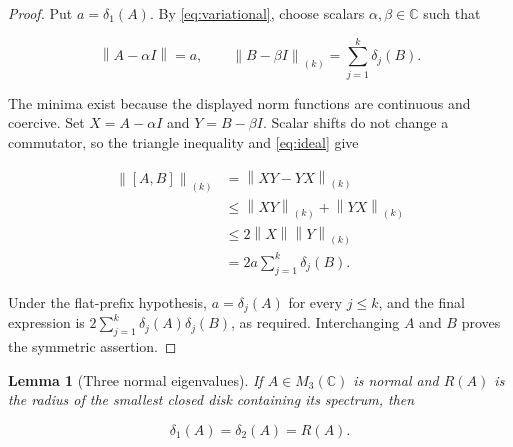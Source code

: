 \documentclass[11pt]{article}
\newtheorem{lemma}{Lemma}
\newcommand{\C}{\mathbb C}
\newcommand{\M}{M}
\newcommand{\norm}[1]{\left\lVert #1\right\rVert}
\begin{document}
\begin{proof}
Put \(a=\delta_1(A)\).  By \eqref{eq:variational}, choose scalars
\(\alpha,\beta\in\C\) such that

\[
 \norm{A-\alpha I}=a,
 \qquad
 \norm{B-\beta I}_{(k)}=\sum_{j=1}^k\delta_j(B).
\]

The minima exist because the displayed norm functions are continuous and
coercive.  Set \(X=A-\alpha I\) and \(Y=B-\beta I\).  Scalar shifts do not
change a commutator, so the triangle inequality and \eqref{eq:ideal} give

\begin{align*}
 \norm{[A,B]}_{(k)}
 &=\norm{XY-YX}_{(k)}\\
 &\leq \norm{XY}_{(k)}+\norm{YX}_{(k)}\\
 &\leq 2\norm{X}\norm{Y}_{(k)}\\
 &=2a\sum_{j=1}^k\delta_j(B).
\end{align*}

Under the flat-prefix hypothesis, \(a=\delta_j(A)\) for every \(j\leq k\),
and the final expression is
\(2\sum_{j=1}^k\delta_j(A)\delta_j(B)\), as required.  Interchanging \(A\)
and \(B\) proves the symmetric assertion.
\end{proof}

\begin{lemma}[Three normal eigenvalues]
\label{lem:normal}
If \(A\in\M_3(\C)\) is normal and \(R(A)\) is the radius of the smallest
closed disk containing its spectrum, then

\[
 \delta_1(A)=\delta_2(A)=R(A).
\]
\end{lemma}
\end{document}
